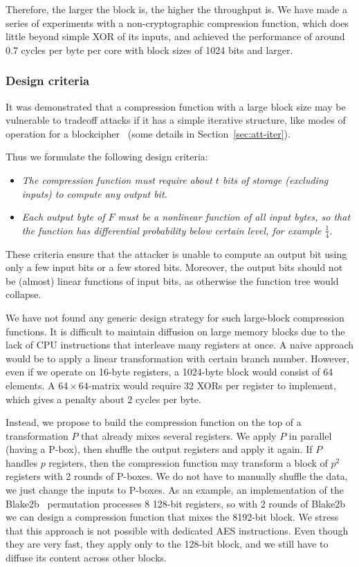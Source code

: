 \documentclass[a4paper]{article}
\begin{document}
Therefore, the larger the block is, the higher the throughput is. We have made a series of experiments with a non-cryptographic compression function, which does little beyond simple XOR of its inputs, and achieved the performance of around 0.7 cycles per byte per core with block sizes of 1024 bits and larger.

\subsubsection{Design criteria}

It was demonstrated that a compression function with a large block size may be vulnerable to tradeoff attacks if it has a simple iterative structure, like modes of operation for a blockcipher~\cite{trade-att} (some details in Section~\ref{sec:att-iter}). 

Thus we formulate the following design criteria:
\begin{itemize}
  \item \emph{The compression function must require about $t$ bits of storage (excluding inputs) to compute any output bit.}
  \item \emph{Each output byte of $F$ must be a nonlinear function of all input bytes, so that the function has differential probability below certain level, for example $\frac{1}{4}$}.
\end{itemize}
These criteria ensure that the attacker is unable to compute an output bit using only a few input bits or a few stored bits. Moreover, the output bits should not be (almost) linear functions of input bits, as otherwise the function tree would collapse.

We have not found any generic design strategy for such large-block compression functions. It is difficult to maintain diffusion on large memory blocks due to the lack of CPU instructions that interleave many registers at once. A naive approach would be to apply a linear transformation with certain branch number. However, even if we operate on 16-byte registers, a 1024-byte block would consist of 64 elements. A $64\times 64$-matrix would require 32 XORs per register to implement, which gives a penalty about 2 cycles per byte.

Instead, we propose to build the compression function on the top of a transformation $P$ that already mixes several registers. We apply $P$ in parallel (having a P-box), then shuffle the output registers and apply it again. If $P$ handles $p$ registers, then the compression function may transform a block of $p^2$ registers with 2 rounds of P-boxes. We do not have to manually shuffle the data, we just change the inputs to P-boxes. As an example, an implementation of the Blake2b~\cite{AumassonNWW13} permutation processes 8 128-bit registers, so with 2 rounds of Blake2b we can design
a compression function that mixes the 8192-bit block. We stress that this approach is not possible with dedicated AES instructions. Even though they are very fast, they apply only to the 128-bit block, and we still have to diffuse its content across other blocks.
\end{document}
